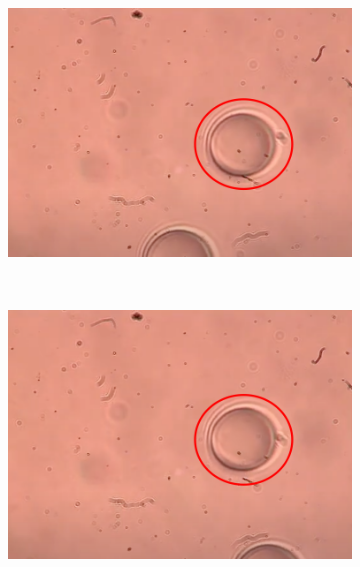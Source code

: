 \documentclass[letterpaper,12pt,oneside]{book}
\begin{document}
\begin{figure}[H]
\begin{subfigure}[b]{0.3\textwidth}
         \includegraphics[width=\textwidth]{orbitando4.png}
         \caption{}
         \label{fig:five over x}
     \end{subfigure}
        \hfill
        \\\noindent \centering \begin{subfigure}[b]{0.3\textwidth}
         \centering
         \includegraphics[width=\textwidth]{orbitando5.png}
         \caption{}
         \label{fig:five over x}
     \end{subfigure}
     \hfill
     \begin{subfigure}[b]{0.3\textwidth}
         \centering

\end{subfigure}
\end{figure}
\end{document}
